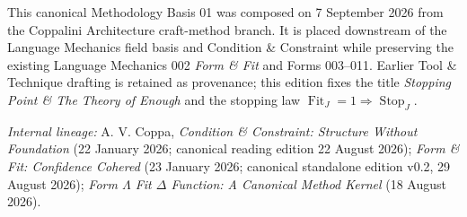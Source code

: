 \documentclass[10pt]{article}
\newcommand{\fit}{\operatorname{Fit}}
\newcommand{\stopop}{\operatorname{Stop}}
\begin{document}
This canonical Methodology Basis 01 was composed on 7 September 2026 from the Coppalini Architecture craft-method branch. It is placed downstream of the Language Mechanics field basis and Condition \& Constraint while preserving the existing Language Mechanics 002 \emph{Form \& Fit} and Forms 003--011. Earlier Tool \& Technique drafting is retained as provenance; this edition fixes the title \emph{Stopping Point \& The Theory of Enough} and the stopping law $\fit_J=1\Rightarrow\stopop_J$.

\smallskip
\noindent\textit{Internal lineage:} A. V. Coppa, \emph{Condition \& Constraint: Structure Without Foundation} (22 January 2026; canonical reading edition 22 August 2026); \emph{Form \& Fit: Confidence Cohered} (23 January 2026; canonical standalone edition v0.2, 29 August 2026); \emph{Form $\Lambda$ Fit $\Delta$ Function: A Canonical Method Kernel} (18 August 2026).
\end{document}
